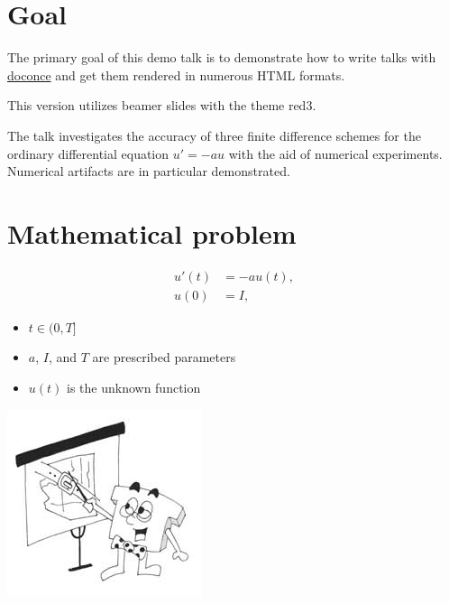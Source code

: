 \documentclass[%
oneside,                 %
final,                   %
10pt]{article}
\newenvironment{graybox1admon}[1][]{
\begin{graybox1mdframed}[frametitle=#1]
}
{
\end{graybox1mdframed}
}
\begin{document}
\section{Goal}

The primary goal of this demo talk is to demonstrate how to write
talks with \href{{http://code.google.com/p/doconce}}{doconce}
and get them rendered in numerous HTML formats.

\begin{graybox1admon}[Layout.]
This version
utilizes beamer slides with the theme red3.
\end{graybox1admon}

The talk investigates the accuracy of three finite difference
schemes for the ordinary differential equation $u'=-au$ with the
aid of numerical experiments. Numerical artifacts are in particular
demonstrated.


\section{Mathematical problem}




\begin{align}
u'(t) &= -au(t),
\label{ode}\\ 
u(0)  &= I,
\label{initial:value}
\end{align}

\begin{itemize}
 \item $t\in (0,T]$

 \item $a$, $I$, and $T$ are prescribed parameters

 \item $u(t)$ is the unknown function
\end{itemize}

\noindent



\begin{center}  %
  \centerline{\includegraphics[width=0.5\linewidth]{../doc/slides/fig/teacher2.jpg}}
\end{center}
\end{document}
